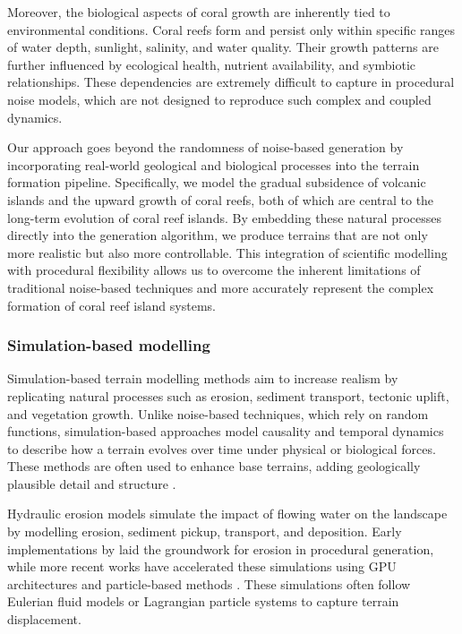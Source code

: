 Moreover, the biological aspects of coral growth are inherently tied to environmental conditions. Coral reefs form and persist only within specific ranges of water depth, sunlight, salinity, and water quality. Their growth patterns are further influenced by ecological health, nutrient availability, and symbiotic relationships. These dependencies are extremely difficult to capture in procedural noise models, which are not designed to reproduce such complex and coupled dynamics.

Our approach goes beyond the randomness of noise-based generation by incorporating real-world geological and biological processes into the terrain formation pipeline. Specifically, we model the gradual subsidence of volcanic islands and the upward growth of coral reefs, both of which are central to the long-term evolution of coral reef islands. By embedding these natural processes directly into the generation algorithm, we produce terrains that are not only more realistic but also more controllable. This integration of scientific modelling with procedural flexibility allows us to overcome the inherent limitations of traditional noise-based techniques and more accurately represent the complex formation of coral reef island systems.

\subsubsection{Simulation-based modelling}

Simulation-based terrain modelling methods aim to increase realism by replicating natural processes such as erosion, sediment transport, tectonic uplift, and vegetation growth. Unlike noise-based techniques, which rely on random functions, simulation-based approaches model causality and temporal dynamics to describe how a terrain evolves over time under physical or biological forces. These methods are often used to enhance base terrains, adding geologically plausible detail and structure \cite{Benes2006, Smelik2009}.


Hydraulic erosion models simulate the impact of flowing water on the landscape by modelling erosion, sediment pickup, transport, and deposition. Early implementations by \cite{Musgrave1989} laid the groundwork for erosion in procedural generation, while more recent works have accelerated these simulations using GPU architectures \cite{Mei2007} and particle-based methods \cite{Neidhold2005}. These simulations often follow Eulerian fluid models or Lagrangian particle systems to capture terrain displacement.

